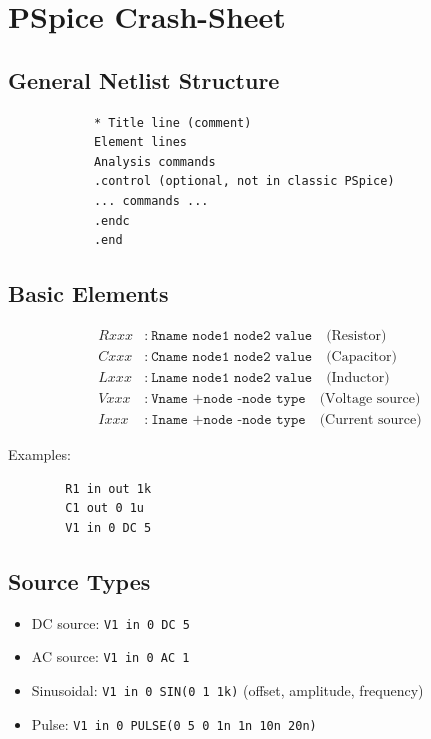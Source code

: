 \documentclass[12pt]{article}
\begin{document}
	
	\section*{PSpice Crash-Sheet}
	
	\subsection*{General Netlist Structure}
	\begin{tcolorbox}[colback=gray!5,colframe=black,title=Structure]
		\begin{verbatim}
			* Title line (comment)
			Element lines
			Analysis commands
			.control (optional, not in classic PSpice)
			... commands ...
			.endc
			.end
		\end{verbatim}
	\end{tcolorbox}
	
	\subsection*{Basic Elements}
	\begin{align*}
		Rxxx &:\ \texttt{Rname node1 node2 value} \quad \text{(Resistor)} \\
		Cxxx &:\ \texttt{Cname node1 node2 value} \quad \text{(Capacitor)} \\
		Lxxx &:\ \texttt{Lname node1 node2 value} \quad \text{(Inductor)} \\
		Vxxx &:\ \texttt{Vname +node -node type} \quad \text{(Voltage source)} \\
		Ixxx &:\ \texttt{Iname +node -node type} \quad \text{(Current source)}
	\end{align*}
	
	Examples:
	\begin{verbatim}
		R1 in out 1k
		C1 out 0 1u
		V1 in 0 DC 5
	\end{verbatim}
	
	\subsection*{Source Types}
	\begin{itemize}
		\item DC source: \verb|V1 in 0 DC 5|
		\item AC source: \verb|V1 in 0 AC 1|
		\item Sinusoidal: \verb|V1 in 0 SIN(0 1 1k)|  (offset, amplitude, frequency)
		\item Pulse: \verb|V1 in 0 PULSE(0 5 0 1n 1n 10n 20n)|
	\end{itemize}
	
\end{document}
